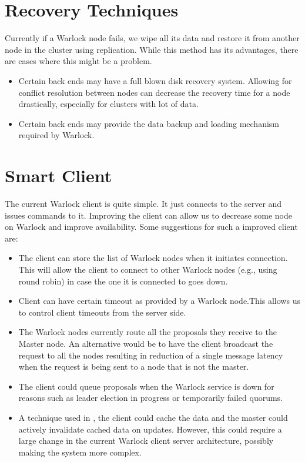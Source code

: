 \section{Recovery Techniques}

Currently if a Warlock node fails, we wipe all its data and restore it from
another node in the cluster using replication. While this method has its
advantages, there are cases where this might be a problem.

\begin{itemize}
  \item Certain back ends may have a full blown disk recovery system.
    Allowing for conflict resolution between nodes can decrease the
    recovery time for a node drastically, especially for clusters
    with lot of data.
  \item Certain back ends may provide the data backup and loading mechanism
    required by Warlock.
\end{itemize}

\section{Smart Client}

The current Warlock client is quite simple. It just connects to the server and
issues commands to it. Improving the client can allow us to decrease some
node on Warlock and improve availability. Some suggestions for such a improved
client are:

\begin{itemize}
  \item The client can store the list of Warlock nodes when it initiates
    connection. This will allow the client to connect to other Warlock nodes
    (e.g., using round robin) in case the one it is connected to goes down.
  \item Client can have certain timeout as provided by a Warlock node.This 
    allows us to control client timeouts from the server side.
  \item The Warlock nodes currently route all the proposals they receive to the
    Master node. An alternative would be to have the client broadcast the
    request to all the nodes resulting in reduction of a single message latency
    when the request is being sent to a node that is not the master.
  \item The client could queue proposals when the Warlock service is down for
    reasons such as leader election in progress or temporarily failed quorums.
  \item A technique used in \citet{Burrows06}, the client could cache the data
    and the master could actively invalidate cached data on updates. However,
    this could require a large change in the current Warlock client server
    architecture, possibly making the system more complex.
\end{itemize}

